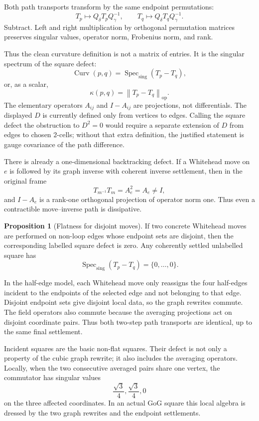 \documentclass[11pt]{article}
\makeatletter
\newcommand{\norm}[1]{\left\|#1\right\|}
\newcommand{\Specsing}{\operatorname{Spec}_{\mathrm{sing}}}
\theoremstyle{definition}
\newtheorem{proposition}[theorem]{Proposition}
\renewenvironment{proof}[1][\proofname]{\par
  \pushQED{\qed}%
  \normalfont \topsep6\p@\@plus6\p@\relax
  \trivlist
  \item[\hskip\labelsep\bfseries #1\@addpunct{.}]\ignorespaces
}{%
  \popQED\endtrivlist\@endpefalse
}
\makeatother
\begin{document}
\begin{proof}
Both path transports transform by the same endpoint permutations:
\[
    T_p\mapsto Q_\delta T_p Q_\gamma^{-1},
    \qquad
    T_q\mapsto Q_\delta T_q Q_\gamma^{-1}.
\]
Subtract.  Left and right multiplication by orthogonal permutation matrices
preserves singular values, operator norm, Frobenius norm, and rank.
\end{proof}

Thus the clean curvature definition is not a matrix of entries.  It is the
singular spectrum of the square defect:
\[
    \operatorname{Curv}(p,q)
    =
    \Specsing(T_p-T_q),
\]
or, as a scalar,
\[
    \kappa(p,q)=\norm{T_p-T_q}_{\mathrm{op}}.
\]
The elementary operators $A_{ij}$ and $I-A_{ij}$ are projections, not
differentials.  The displayed $D$ is currently defined only from vertices to
edges.  Calling the square defect the obstruction to $D^2=0$ would require a
separate extension of $D$ from edges to chosen $2$-cells; without that extra
definition, the justified statement is gauge covariance of the path
difference.

There is already a one-dimensional backtracking defect.  If a Whitehead move
on $e$ is followed by its graph inverse with coherent inverse settlement, then
in the original frame
\[
    T_{m^{-1}}T_m=A_e^2=A_e\ne I,
\]
and $I-A_e$ is a rank-one orthogonal projection of operator norm one.  Thus
even a contractible move--inverse path is dissipative.

\begin{proposition}[Flatness for disjoint moves]
If two concrete Whitehead moves are performed on non-loop edges whose endpoint
sets are disjoint, then the corresponding labelled square defect is zero.  Any
coherently settled unlabelled square has
\[
    \Specsing(T_p-T_q)=\{0,\ldots,0\}.
\]
\end{proposition}

\begin{proof}
In the half-edge model, each Whitehead move only reassigns the four half-edges
incident to the endpoints of the selected edge and not belonging to that edge.
Disjoint endpoint sets give disjoint local data, so the graph rewrites commute.
The field operators also commute because the averaging projections act on
disjoint coordinate pairs.  Thus both two-step path transports are identical,
up to the same final settlement.
\end{proof}

Incident squares are the basic non-flat squares.  Their defect is not only a
property of the cubic graph rewrite; it also includes the averaging operators.
Locally, when the two consecutive averaged pairs share one vertex, the
commutator has singular values
\[
    \frac{\sqrt3}{4},\frac{\sqrt3}{4},0
\]
on the three affected coordinates.  In an actual GoG square this local algebra
is dressed by the two graph rewrites and the endpoint settlements.
\end{document}
